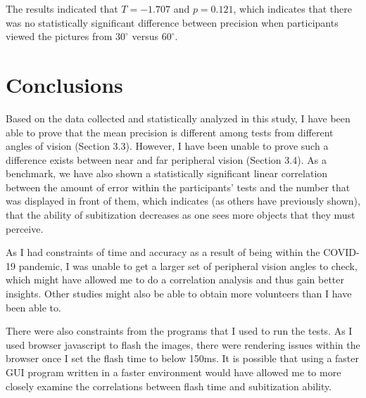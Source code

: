 \documentclass[12pt]{article}
\begin{document}
The results indicated that $T = -1.707$ and $p = 0.121$, which indicates that
there was no statistically significant difference between precision when
participants viewed the pictures from $30^{\circ}$ versus $60^{\circ}$.

\section{Conclusions}
Based on the data collected and statistically analyzed in this study, I have
been able to prove that the mean precision is different among tests from
different angles of vision (Section 3.3).  However, I have been unable to prove
such a difference exists between near and far peripheral vision (Section 3.4).
As a benchmark, we have also shown a statistically significant linear
correlation between the amount of error within the participants' tests and the
number that was displayed in front of them, which indicates (as others have
previously shown), that the ability of subitization decreases as one
sees more objects that they must perceive.

As I had constraints of time and accuracy as a result of being within the
COVID-19 pandemic, I was unable to get a larger set of peripheral vision angles
to check, which might have allowed me to do a correlation analysis and thus
gain better insights. Other studies might also be able to obtain more
volunteers than I have been able to.

There were also constraints from the programs that I used to run the tests. As
I used browser javascript to flash the images, there were rendering issues
within the browser once I set the flash time to below 150ms. It is possible
that using a faster GUI program written in a faster environment would have
allowed me to more closely examine the correlations between flash time and
subitization ability.

\printbibliography
\end{document}
